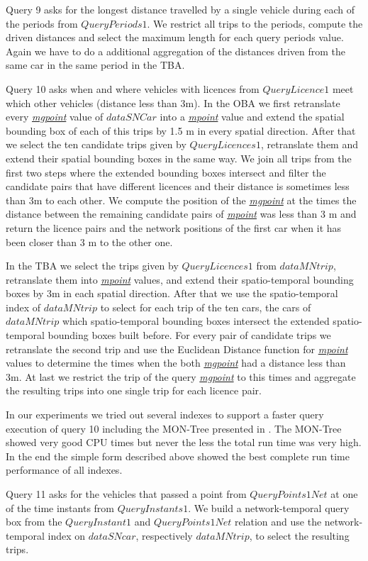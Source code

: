 \documentclass[a4paper]{article}
\newcommand{\dt}[1]{\textsl{\underline{#1}}}
\begin{document}
{Query 9 asks for the longest distance travelled by a single vehicle during each
of the periods from $QueryPeriods1$. We restrict all trips to the periods, compute
the driven distances and select the maximum length for each query periods value.
Again we have to do a additional aggregation of the distances driven from the same
car in the same period in the TBA.

Query 10 asks when and where vehicles with licences from $QueryLicence1$ meet which
other vehicles (distance less than 3m). In the OBA we first retranslate every
\dt{mgpoint} value of $dataSNCar$ into a \dt{mpoint} value and extend the spatial
bounding box of each of this trips by 1.5 m in every spatial direction. After that we
select the ten candidate trips given by $QueryLicences1$, retranslate them and
extend their spatial bounding boxes in the same way. We join all trips from the
first two steps where the extended bounding boxes intersect and filter the
candidate pairs that have different licences and their distance is sometimes
less than 3m to each other. We compute the position of the \dt{mgpoint} at the
times the distance between the remaining candidate pairs of \dt{mpoint} was less
than 3 m and return the licence pairs and the network positions of the first car
when it has been closer than 3 m to the other one.

In the TBA we select the trips given by $QueryLicences1$ from
$dataMNtrip$, retranslate them into \dt{mpoint} values, and extend their spatio-temporal
bounding boxes by 3m in each spatial direction. After that we use the spatio-temporal
index of $dataMNtrip$ to select for each trip of the ten cars, the cars
of $dataMNtrip$ which spatio-temporal bounding boxes intersect the extended spatio-temporal
bounding boxes built before. For every pair of candidate trips we
retranslate the second trip and use the Euclidean Distance function for \dt{mpoint}
values to determine the times when the both \dt{mgpoint} had a distance less than 3m.
At last we restrict the trip of the query \dt{mgpoint} to this times and
aggregate the resulting trips into one single trip for each licence pair.

In our experiments we tried out several indexes to support a faster query execution
of query 10 including the MON-Tree presented in \cite{MONTree}. The MON-Tree showed
very good CPU times but never the less the total run time was very high. In the end
the simple form described above showed the best complete run time performance of all
indexes.

Query 11 asks for the vehicles that passed a point from $QueryPoints1Net$ at one of the
time instants from $QueryInstants1$. We build a network-temporal query box from the
$QueryInstant1$ and $QueryPoints1Net$ relation and use the network-temporal index
on $dataSNcar$, respectively $dataMNtrip$, to select the resulting trips.

}
\end{document}
